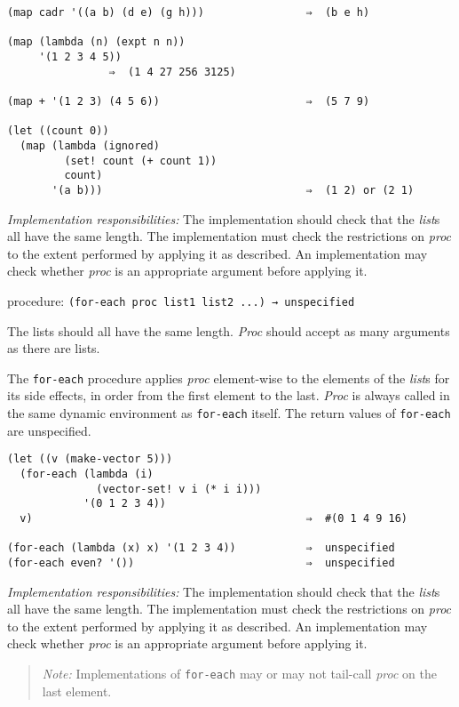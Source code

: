 \begin{verbatim}
(map cadr '((a b) (d e) (g h)))                ⇒  (b e h)

(map (lambda (n) (expt n n))
     '(1 2 3 4 5))
                ⇒  (1 4 27 256 3125)

(map + '(1 2 3) (4 5 6))                       ⇒  (5 7 9)

(let ((count 0))
  (map (lambda (ignored)
         (set! count (+ count 1))
         count)
       '(a b)))                                ⇒  (1 2) or (2 1)
\end{verbatim}

\emph{Implementation responsibilities:} The implementation should check
that the \emph{list}s all have the same length. The implementation must
check the restrictions on \emph{proc} to the extent performed by
applying it as described. An implementation may check whether
\emph{proc} is an appropriate argument before applying it.

procedure: \texttt{(for-each\ proc\ list1\ list2\ ...)\ →\ unspecified}

The lists should all have the same length. \emph{Proc} should accept as
many arguments as there are lists.

The \texttt{for-each} procedure applies \emph{proc} element-wise to the
elements of the \emph{list}s for its side effects, in order from the
first element to the last. \emph{Proc} is always called in the same
dynamic environment as \texttt{for-each} itself. The return values of
\texttt{for-each} are unspecified.

\begin{verbatim}
(let ((v (make-vector 5)))
  (for-each (lambda (i)
              (vector-set! v i (* i i)))
            '(0 1 2 3 4))
  v)                                           ⇒  #(0 1 4 9 16)

(for-each (lambda (x) x) '(1 2 3 4))           ⇒  unspecified
(for-each even? '())                           ⇒  unspecified
\end{verbatim}

\emph{Implementation responsibilities:} The implementation should check
that the \emph{list}s all have the same length. The implementation must
check the restrictions on \emph{proc} to the extent performed by
applying it as described. An implementation may check whether
\emph{proc} is an appropriate argument before applying it.

\begin{quote}
\emph{Note:} Implementations of \texttt{for-each} may or may not
tail-call \emph{proc} on the last element.
\end{quote}

